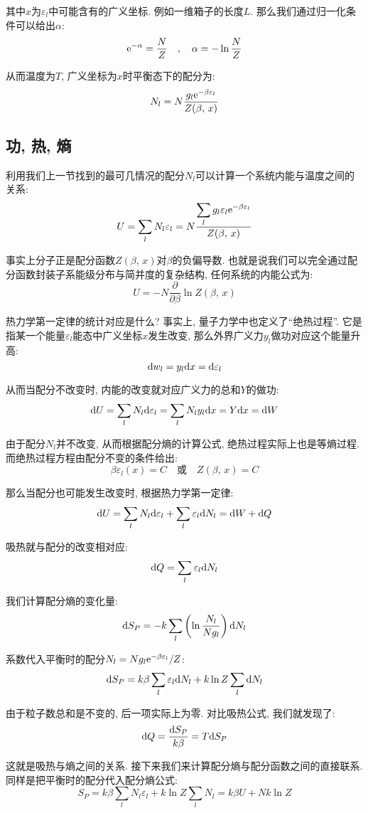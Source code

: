 其中$x$为$\varepsilon_l$中可能含有的广义坐标. 例如一维箱子的长度$L$. 那么我们通过归一化条件可以给出$\alpha$:
\[{\rm e}^{-\alpha}=\frac{N}{Z} \quad,\quad \alpha=-\ln\frac{N}{Z}\]

从而温度为$T$, 广义坐标为$x$时平衡态下的配分为:
\[N_l=N\frac{g_l{\rm e}^{-\beta \varepsilon_l}}{Z(\beta,\,x)}\]



\subsection{功, 热, 熵}

利用我们上一节找到的最可几情况的配分$N_l$可以计算一个系统内能与温度之间的关系:
\[U=\sum_l N_l\varepsilon_l=N\frac{\displaystyle\sum_lg_l\varepsilon_l {\rm e}^{-\beta \varepsilon_l}}{Z(\beta,\,x)}\]

事实上分子正是配分函数$Z(\beta,\,x)$对$\beta$的负偏导数. 也就是说我们可以完全通过配分函数封装子系能级分布与简并度的复杂结构, 任何系统的内能公式为:
\[U=-N\frac{\partial}{\partial \beta}\ln Z(\beta,\,x)\]

热力学第一定律的统计对应是什么? 事实上, 量子力学中也定义了``绝热过程''. 它是指某一个能量$\varepsilon_l$能态中广义坐标$x$发生改变, 那么外界广义力$y_l$做功对应这个能量升高:
\[\textrm{d} w_l=y_l\textrm{d} x=\textrm{d}\varepsilon_l\]

从而当配分不改变时, 内能的改变就对应广义力的总和$Y$的做功:
\[\textrm{d} U=\sum_lN_l\textrm{d} \varepsilon_l=\sum_lN_ly_l\textrm{d} x=Y\textrm{d} x=\textrm{d} W\]

由于配分$N_l$并不改变, 从而根据配分熵的计算公式, 绝热过程实际上也是等熵过程. 而绝热过程方程由配分不变的条件给出:
\[\beta \varepsilon_l(x)=C \quad\text{或}\quad Z(\beta,\,x)=C\]

那么当配分也可能发生改变时, 根据热力学第一定律:
\[\textrm{d} U=\sum_lN_l\textrm{d} \varepsilon_l+\sum_l\varepsilon_l\textrm{d} N_l=\textrm{d} W+\textrm{d} Q\]

吸热就与配分的改变相对应:
\[\textrm{d} Q=\sum_l\varepsilon_l\textrm{d} N_l\]

我们计算配分熵的变化量:
\[\textrm{d} S_P=-k\sum_l \left(\ln\frac{N_l}{Ng_l}\right)\textrm{d} N_l\]

系数代入平衡时的配分$N_l=Ng_l{\rm e}^{-\beta \varepsilon_l}/Z$:
\[\textrm{d} S_P=k\beta\sum_l \varepsilon_l \textrm{d} N_l+k\ln Z\sum_l \textrm{d} N_l\]

由于粒子数总和是不变的, 后一项实际上为零. 对比吸热公式, 我们就发现了:
\[\textrm{d} Q=\frac{\textrm{d} S_P}{k\beta}=T\textrm{d} S_P\]

这就是吸热与熵之间的关系. 接下来我们来计算配分熵与配分函数之间的直接联系. 同样是把平衡时的配分代入配分熵公式:
\[S_P=k\beta\sum_l N_l\varepsilon_l  +k\ln Z\sum_l N_l=k\beta U+Nk\ln Z\]

